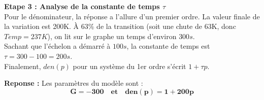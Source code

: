 \documentclass[11pt,a4paper]{article}
\begin{document}
\textbf{Etape 3 : Analyse de la constante de temps $\tau$}\\
Pour le dénominateur, la réponse a l'allure d'un premier ordre.
La valeur finale de la variation est 200K. À $63\%$ de la transition (soit une chute de 63K, donc $Temp=237K$), on lit sur le graphe un temps d'environ $300s$.\\
Sachant que l'échelon a démarré à $100s$, la constante de temps est $\tau = 300 - 100 = 200s$.\\
Finalement, $den(p)$ pour un système du 1er ordre s'écrit $1 + \tau p$.

\textbf{Reponse :} Les paramètres du modèle sont :
$$
\mathbf{G = -300 \quad \text{et} \quad den(p) = 1 + 200p}
$$
\end{document}
